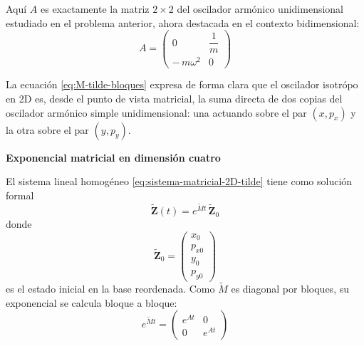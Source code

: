 \documentclass{article}
\begin{document}
Aquí $A$ es exactamente la matriz $2\times 2$ del oscilador armónico
unidimensional estudiado en el problema anterior, ahora destacada en el contexto
bidimensional:
\begin{equation}
A =
\begin{pmatrix}
0 & \dfrac{1}{m} \\[6pt]
-\,m\omega^{2} & 0
\end{pmatrix}
\label{eq:matriz-A-oscilador-2D}
\end{equation}

La ecuación \eqref{eq:M-tilde-bloques} expresa de forma clara que el oscilador
isotrópo en 2D es, desde el punto de vista matricial, la suma directa de dos
copias del oscilador armónico simple unidimensional: una actuando sobre el par
$(x,p_{x})$ y la otra sobre el par $(y,p_{y})$.

\textcolor{trueblue}{\textbf{Exponencial matricial en dimensión cuatro}}

El sistema lineal homogéneo \eqref{eq:sistema-matricial-2D-tilde} tiene como
solución formal
\begin{equation}
\widetilde{\mathbf{Z}}(t)
=
e^{\widetilde{M}t}\,\widetilde{\mathbf{Z}}_{0}
\label{eq:solucion-formal-2D-tilde}
\end{equation}
donde
\[
\widetilde{\mathbf{Z}}_{0} =
\begin{pmatrix}
x_{0} \\[2pt]
p_{x0} \\[2pt]
y_{0} \\[2pt]
p_{y0}
\end{pmatrix}
\]
es el estado inicial en la base reordenada. Como $\widetilde{M}$ es diagonal por
bloques, su exponencial se calcula bloque a bloque:
\begin{equation}
e^{\widetilde{M}t}
=
\begin{pmatrix}
e^{At} & 0 \\[4pt]
0      & e^{At}
\end{pmatrix}
\label{eq:exp-M-tilde}
\end{equation}
\end{document}
